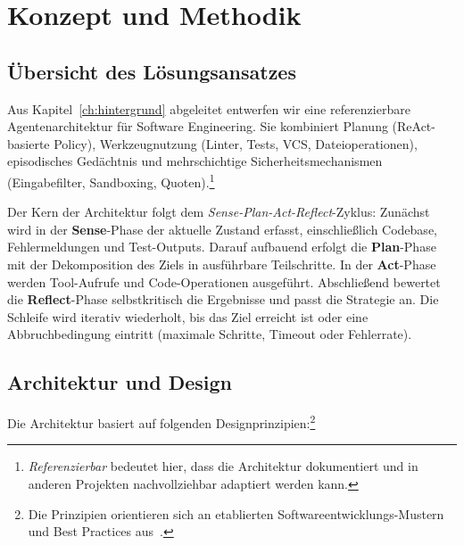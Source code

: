 
\chapter{Konzept und Methodik}
%
%
%
\label{ch:konzept}

\section{Übersicht des Lösungsansatzes}

Aus Kapitel~\ref{ch:hintergrund} abgeleitet entwerfen wir eine referenzierbare Agentenarchitektur für Software Engineering. Sie kombiniert Planung (ReAct-basierte Policy), Werkzeugnutzung (Linter, Tests, VCS, Dateioperationen), episodisches Gedächtnis und mehrschichtige Sicherheitsmechanismen (Eingabefilter, Sandboxing, Quoten).\footnote{\emph{Referenzierbar} bedeutet hier, dass die Architektur dokumentiert und in anderen Projekten nachvollziehbar adaptiert werden kann.}

Der Kern der Architektur folgt dem \emph{Sense-Plan-Act-Reflect}-Zyklus: Zunächst wird in der \textbf{Sense}-Phase der aktuelle Zustand erfasst, einschließlich Codebase, Fehlermeldungen und Test-Outputs. Darauf aufbauend erfolgt die \textbf{Plan}-Phase mit der Dekomposition des Ziels in ausführbare Teilschritte. In der \textbf{Act}-Phase werden Tool-Aufrufe und Code-Operationen ausgeführt. Abschließend bewertet die \textbf{Reflect}-Phase selbstkritisch die Ergebnisse und passt die Strategie an. Die Schleife wird iterativ wiederholt, bis das Ziel erreicht ist oder eine Abbruchbedingung eintritt (maximale Schritte, Timeout oder Fehlerrate).

\section{Architektur und Design}

Die Architektur basiert auf folgenden Designprinzipien:\footnote{Die Prinzipien orientieren sich an etablierten Softwareentwicklungs-Mustern und Best Practices aus~\cite{sommerville2015software}.}


